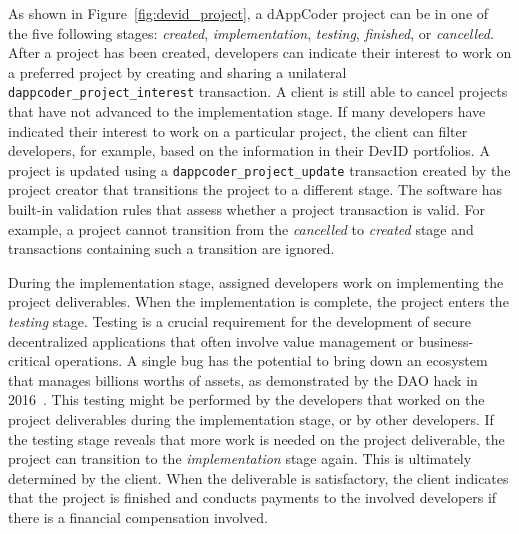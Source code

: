 
As shown in Figure~\ref{fig:devid_project}, a dAppCoder project can be in one of the five following stages: \emph{created}, \emph{implementation}, \emph{testing}, \emph{finished}, or \emph{cancelled}.
After a project has been created, developers can indicate their interest to work on a preferred project by creating and sharing a unilateral \texttt{dappcoder\_project\_interest} transaction.
A client is still able to cancel projects that have not advanced to the implementation stage.
If many developers have indicated their interest to work on a particular project, the client can filter developers, for example, based on the information in their DevID portfolios.
A project is updated using a \texttt{dappcoder\_project\_update} transaction created by the project creator that transitions the project to a different stage.
The \Dappcoder{} software has built-in validation rules that assess whether a project transaction is valid.
For example, a project cannot transition from the \emph{cancelled} to \emph{created} stage and transactions containing such a transition are ignored.

During the implementation stage, assigned developers work on implementing the project deliverables.
When the implementation is complete, the project enters the \emph{testing} stage.
Testing is a crucial requirement for the development of secure decentralized applications that often involve value management or business-critical operations.
A single bug has the potential to bring down an ecosystem that manages billions worths of assets, as demonstrated by the DAO hack in 2016~\cite{dhillon2017dao}.
This testing might be performed by the developers that worked on the project deliverables during the implementation stage, or by other developers.
If the testing stage reveals that more work is needed on the project deliverable, the project can transition to the \emph{implementation} stage again.
This is ultimately determined by the client.
When the deliverable is satisfactory, the client indicates that the project is finished and conducts payments to the involved developers if there is a financial compensation involved.

